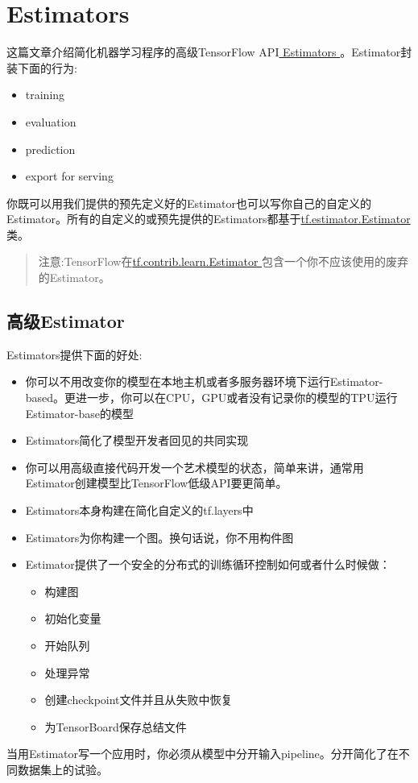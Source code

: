 \section{Estimators}
这篇文章介绍简化机器学习程序的高级TensorFlow API\href{https://www.tensorflow.org/api_docs/python/tf/estimator?hl=zh-cn}{ Estimators }。Estimator封装下面的行为:
\begin{itemize}
\item training
\item evaluation
\item prediction
\item export for serving
\end{itemize}
你既可以用我们提供的预先定义好的Estimator也可以写你自己的自定义的Estimator。所有的自定义的或预先提供的Estimators都基于\href{https://www.tensorflow.org/api_docs/python/tf/estimator/Estimator?hl=zh-cn}{tf.estimator.Estimator}类。
\begin{quote}
注意:TensorFlow在\href{https://www.tensorflow.org/api_docs/python/tf/contrib/learn/Estimator?hl=zh-cn}{tf.contrib.learn.Estimator }包含一个你不应该使用的废弃的Estimator。
\end{quote}
\subsection{高级Estimator}
Estimators提供下面的好处:
\begin{itemize}
\item 你可以不用改变你的模型在本地主机或者多服务器环境下运行Estimator-based。更进一步，你可以在CPU，GPU或者没有记录你的模型的TPU运行Estimator-base的模型
\item Estimators简化了模型开发者回见的共同实现
\item 你可以用高级直接代码开发一个艺术模型的状态，简单来讲，通常用Estimator创建模型比TensorFlow低级API要更简单。
\item Estimators本身构建在简化自定义的tf.layers中
\item Estimators为你构建一个图。换句话说，你不用构件图
\item Estimator提供了一个安全的分布式的训练循环控制如何或者什么时候做：
\begin{itemize}
\item 构建图
\item 初始化变量
\item 开始队列
\item 处理异常
\item 创建checkpoint文件并且从失败中恢复
\item 为TensorBoard保存总结文件
\end{itemize}
\end{itemize}
当用Estimator写一个应用时，你必须从模型中分开输入pipeline。分开简化了在不同数据集上的试验。
